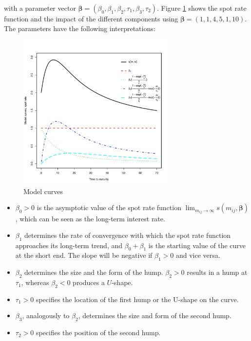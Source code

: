 with a parameter vector ${\bm{\beta}} = \left(\beta_0,\beta_1,\beta_2,\tau_1,\beta_3,\tau_2\right)$. Figure \ref{fig:modelcurves} shows the \cite{Svensson1994} spot rate function and the impact of the different components using $\bm{\beta} = (1, 1, 4, 5, 1, 10)$. The parameters have the following interpretations:

%

\begin{figure}[htb]
\centering
  \caption{Model curves}
 \label{fig:modelcurves}
\includegraphics[width=0.7\textwidth]{curveshape}
\end{figure}

\begin{itemize}
\item $\beta_0>0$ is the asymptotic value of the spot rate function $\lim_{m_{ij}\to\infty}s(m_{ij},\bm{\beta})$, which can be seen as the long-term interest rate.
\item $\beta_1$ determines the rate of convergence with which the spot rate function approaches its long-term trend, and $\beta_0+\beta_1$ is the starting value of the curve at the short end. The slope will be negative if $\beta_1>0$ and vice versa.
\item $\beta_2$ determines the size and the form of the hump. $\beta_2 >0$  results in a hump at  $\tau_1$, whereas $\beta_2<0$ produces a $U$-shape.
\item $\tau_1>0$ specifies the location of the first hump or the U-shape on the curve.
\item $\beta_3$, analogously to $\beta_2$, determines the size and form of the second hump.
\item $\tau_2>0$ specifies the position of the second hump.
\end{itemize}

